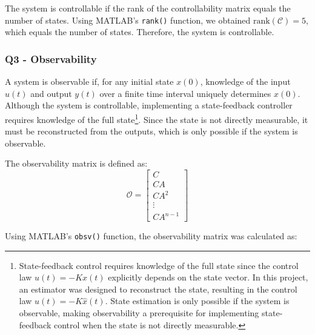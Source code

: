 \par The system is controllable if the rank of the controllability matrix equals the number of states. Using MATLAB's \texttt{rank()} function, we obtained $\text{rank}(\mathcal{C}) = 5$, which equals the number of states. Therefore, the system is controllable.
\\
\subsubsection{Q3 - Observability}

\par A system is observable if, for any initial state $x(0)$, knowledge of the input $u(t)$ and output $y(t)$ over a finite time interval uniquely determines $x(0)$. Although the system is controllable, implementing a state-feedback controller requires knowledge of the full state\footnote{State-feedback control requires knowledge of the full state since the control law $u(t) = -Kx(t)$ explicitly depends on the state vector. In this project, an estimator was designed to reconstruct the state, resulting in the control law $u(t) = -K\hat{x}(t)$. State estimation is only possible if the system is observable, making observability a prerequisite for implementing state-feedback control when the state is not directly measurable.}. Since the state is not directly measurable, it must be reconstructed from the outputs, which is only possible if the system is observable.

\par The observability matrix is defined as:
\begin{equation}
\mathcal{O} = 
\begin{bmatrix}
C \\
CA \\
CA^2 \\
\vdots \\
CA^{n-1}
\end{bmatrix}
\end{equation}

\par Using MATLAB's \texttt{obsv()} function, the observability matrix was calculated as:

